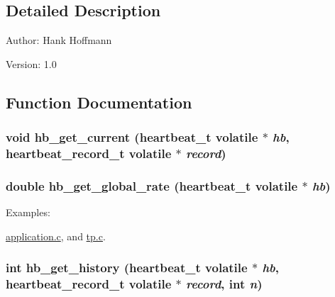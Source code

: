 \subsection{Detailed Description}
\begin{Desc}
\item[Author:]Hank Hoffmann \end{Desc}
\begin{Desc}
\item[Version:]1.0 \end{Desc}


\subsection{Function Documentation}
\hypertarget{heartbeat-file_8c_75042acfdcb08a614964eab511fe6299}{
\subsubsection[hb\_\-get\_\-current]{\setlength{\rightskip}{0pt plus 5cm}void hb\_\-get\_\-current ({\bf heartbeat\_\-t} volatile $\ast$ {\em hb}, \/  {\bf heartbeat\_\-record\_\-t} volatile $\ast$ {\em record})}}
\label{heartbeat-file_8c_75042acfdcb08a614964eab511fe6299}


\hypertarget{heartbeat-file_8c_55b60b6aa61bbb71ee099f2e7180540e}{
\subsubsection[hb\_\-get\_\-global\_\-rate]{\setlength{\rightskip}{0pt plus 5cm}double hb\_\-get\_\-global\_\-rate ({\bf heartbeat\_\-t} volatile $\ast$ {\em hb})}}
\label{heartbeat-file_8c_55b60b6aa61bbb71ee099f2e7180540e}


\begin{Desc}
\item[Examples: ]\par
\hyperlink{application_8c-example}{application.c}, and \hyperlink{tp_8c-example}{tp.c}.\end{Desc}
\hypertarget{heartbeat-file_8c_d75f7029162a84476c6e7411f59f86f2}{
\subsubsection[hb\_\-get\_\-history]{\setlength{\rightskip}{0pt plus 5cm}int hb\_\-get\_\-history ({\bf heartbeat\_\-t} volatile $\ast$ {\em hb}, \/  {\bf heartbeat\_\-record\_\-t} volatile $\ast$ {\em record}, \/  int {\em n})}}
\label{heartbeat-file_8c_d75f7029162a84476c6e7411f59f86f2}



